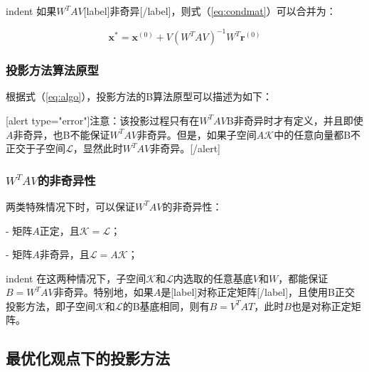 \documentclass[UTF8,nofonts]{ctexart}
\begin{document}
indent 如果$W^TAV$[label]非奇异[/label]，则式（\ref{eq:condmat}）可以合并为：

\begin{equation}
\label{eq:algo}
\boldsymbol{x}^\ast=\boldsymbol{x}^{(0)}+V(W^TAV)^{-1}W^T\boldsymbol{r}^{(0)}
\end{equation}

\subsubsection*{投影方法算法原型}

根据式（\ref{eq:algo}），投影方法的B算法原型可以描述为如下：

\begin{algorithm}[H]
\end{algorithm}

[alert type="error"]注意：该投影过程只有在$W^TAV$B非奇异时才有定义，并且即使$A$非奇异，也B不能保证$W^TAV$非奇异。但是，如果子空间$A\mathcal{K}$中的任意向量都B不正交于子空间$\mathcal{L}$，显然此时$W^TAV$非奇异。[/alert]

\subsubsection*{$W^TAV$的非奇异性}

两类特殊情况下时，可以保证$W^TAV$的非奇异性：

- 矩阵$A$正定，且$\mathcal{K}=\mathcal{L}$；

- 矩阵$A$非奇异，且$\mathcal{L}=A\mathcal{K}$；

indent 在这两种情况下，子空间$\mathcal{K}$和$\mathcal{L}$内选取的任意基底$V$和$W$，都能保证$B=W^TAV$非奇异。特别地，如果$A$是[label]对称正定矩阵[/label]，且使用B正交投影方法，即子空间$\mathcal{K}$和$\mathcal{L}$的B基底相同，则有$B=V^TAT$，此时$B$也是对称正定矩阵。

\subsection*{最优化观点下的投影方法}
\end{document}
